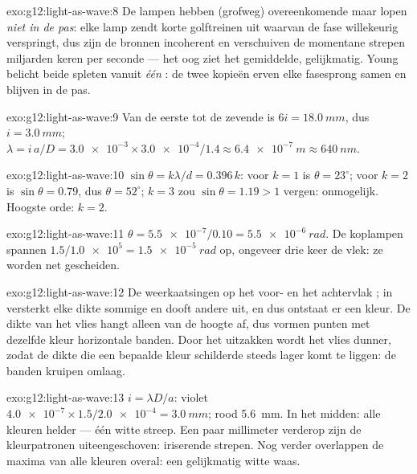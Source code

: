 \begin{solution}{exo:g12:light-as-wave:8}
De lampen hebben (grofweg) overeenkomende  maar lopen \emph{niet
in de pas}: elke lamp zendt korte golftreinen uit waarvan de fase
willekeurig verspringt, dus zijn de bronnen incoherent en verschuiven de
momentane strepen miljarden keren per seconde --- het oog ziet het
gemiddelde, gelijkmatig. Young belicht beide spleten vanuit \emph{één}
: de twee kopieën erven elke fasesprong samen en blijven in de pas.
\end{solution}

\begin{solution}{exo:g12:light-as-wave:9}
Van de eerste tot de zevende is $6i = \qty{18.0}{mm}$, dus
$i = \qty{3.0}{mm}$; $\lambda = i\,a/D = \num{3.0e-3} \times
\num{3.0e-4}/1.4 \approx \qty{6.4e-7}{m} \approx \qty{640}{nm}$.
\end{solution}

\begin{solution}{exo:g12:light-as-wave:10}
$\sin\theta = k\lambda/d = 0.396\,k$: voor $k = 1$ is
$\theta = 23^\circ$; voor $k = 2$ is $\sin\theta = 0.79$, dus
$\theta = 52^\circ$; $k = 3$ zou $\sin\theta = 1.19 > 1$ vergen:
onmogelijk. Hoogste orde: $k = 2$.
\end{solution}

\begin{solution}{exo:g12:light-as-wave:11}
$\theta = \num{5.5e-7}/0.10 = \qty{5.5e-6}{rad}$. De koplampen spannen
$1.5/\num{1.0e5} = \qty{1.5e-5}{rad}$ op, ongeveer drie keer de vlek: ze
worden net gescheiden.
\end{solution}

\begin{solution}{exo:g12:light-as-wave:12}
De weerkaatsingen op het voor- en het achtervlak ; in  versterkt elke dikte sommige  en dooft andere uit, en
dus ontstaat er een kleur. De dikte van het vlies hangt alleen van de
hoogte af, dus vormen punten met dezelfde kleur horizontale banden. Door
het uitzakken wordt het vlies dunner, zodat de dikte die een bepaalde
kleur schilderde steeds lager komt te liggen: de banden kruipen omlaag.
\end{solution}

\begin{solution}{exo:g12:light-as-wave:13}
$i = \lambda D/a$: violet $\num{4.0e-7} \times 1.5/\num{2.0e-4} =
\qty{3.0}{mm}$; rood \qty{5.6}{mm}. In het midden: alle kleuren helder
--- één witte streep. Een paar millimeter verderop zijn de
kleurpatronen uiteengeschoven: iriserende strepen. Nog verder overlappen
de maxima van alle kleuren overal: een gelijkmatig witte waas.
\end{solution}

